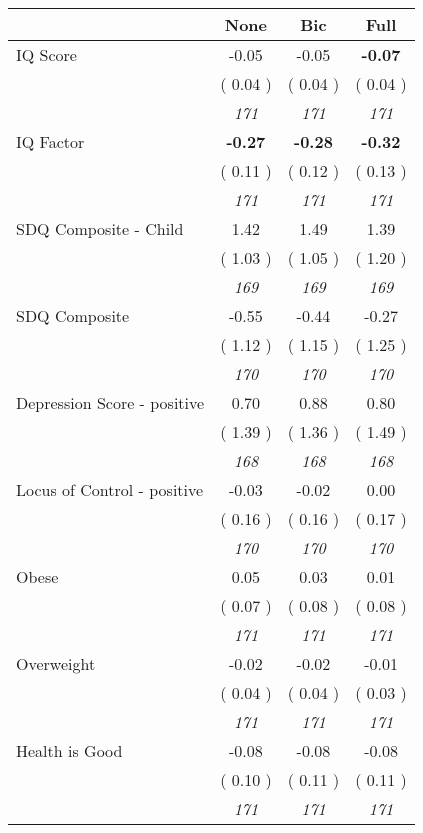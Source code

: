 \begin{tabular}{l c c c}
\toprule
 & None & Bic & Full \\
\midrule
IQ Score &     -0.05 &     -0.05 & \textbf{     -0.07 } \\
& (     0.04 ) & (     0.04 ) & (     0.04 ) \\
& \textit{ 171 } & \textit{ 171 } & \textit{ 171 } \\
IQ Factor & \textbf{     -0.27 } & \textbf{     -0.28 } & \textbf{     -0.32 } \\
& (     0.11 ) & (     0.12 ) & (     0.13 ) \\
& \textit{ 171 } & \textit{ 171 } & \textit{ 171 } \\
SDQ Composite - Child &      1.42 &      1.49 &      1.39 \\
& (     1.03 ) & (     1.05 ) & (     1.20 ) \\
& \textit{ 169 } & \textit{ 169 } & \textit{ 169 } \\
SDQ Composite &     -0.55 &     -0.44 &     -0.27 \\
& (     1.12 ) & (     1.15 ) & (     1.25 ) \\
& \textit{ 170 } & \textit{ 170 } & \textit{ 170 } \\
Depression Score - positive &      0.70 &      0.88 &      0.80 \\
& (     1.39 ) & (     1.36 ) & (     1.49 ) \\
& \textit{ 168 } & \textit{ 168 } & \textit{ 168 } \\
Locus of Control - positive &     -0.03 &     -0.02 &      0.00 \\
& (     0.16 ) & (     0.16 ) & (     0.17 ) \\
& \textit{ 170 } & \textit{ 170 } & \textit{ 170 } \\
Obese &      0.05 &      0.03 &      0.01 \\
& (     0.07 ) & (     0.08 ) & (     0.08 ) \\
& \textit{ 171 } & \textit{ 171 } & \textit{ 171 } \\
Overweight &     -0.02 &     -0.02 &     -0.01 \\
& (     0.04 ) & (     0.04 ) & (     0.03 ) \\
& \textit{ 171 } & \textit{ 171 } & \textit{ 171 } \\
Health is Good &     -0.08 &     -0.08 &     -0.08 \\
& (     0.10 ) & (     0.11 ) & (     0.11 ) \\
& \textit{ 171 } & \textit{ 171 } & \textit{ 171 } \\

\end{tabular}
